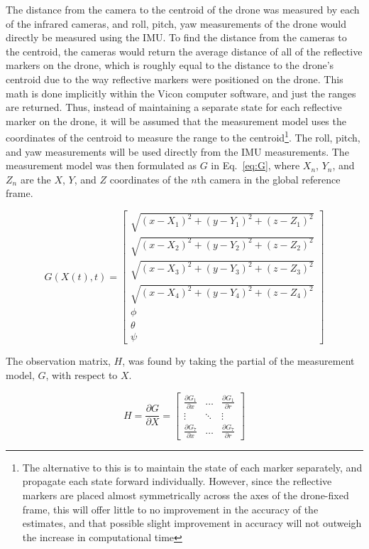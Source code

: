 \documentclass[letterpaper, paper,11pt]{AAS}	%
\begin{document}
The distance from the camera to the centroid of the drone was measured by each of the infrared cameras, and roll, pitch, yaw measurements of the drone would directly be measured using the IMU. To find the distance from the cameras to the centroid, the cameras would return the average distance of all of the reflective markers on the drone, which is roughly equal to the distance to the drone's centroid due to the way reflective markers were positioned on the drone. This math is done implicitly within the Vicon computer software, and just the ranges are returned. Thus, instead of maintaining a separate state for each reflective marker on the drone, it will be assumed that the measurement model uses the coordinates of the centroid to measure the range to the centroid\footnote{The alternative to this is to maintain the state of each marker separately, and propagate each state forward individually. However, since the reflective markers are placed almost symmetrically across the axes of the drone-fixed frame, this will offer little to no improvement in the accuracy of the estimates, and that possible slight improvement in accuracy will not outweigh the increase in computational time}. The roll, pitch, and yaw measurements will be used directly from the IMU measurements. The measurement model was then formulated as $G$ in Eq.~\ref{eq:G}, where $X_n$, $Y_n$, and $Z_n$ are the $X$, $Y$, and $Z$ coordinates of the $n$th camera in the global reference frame.

\begin{equation}
\label{eq:G}
G(X(t), t) = 
\begin{bmatrix}
	\sqrt{(x-X_1)^2 + (y-Y_1)^2 + (z-Z_1)^2} \\
	\sqrt{(x-X_2)^2 + (y-Y_2)^2 + (z-Z_2)^2} \\
	\sqrt{(x-X_3)^2 + (y-Y_3)^2 + (z-Z_3)^2} \\
	\sqrt{(x-X_4)^2 + (y-Y_4)^2 + (z-Z_4)^2} \\
	\phi \\
	\theta \\
	\psi
\end{bmatrix}
\end{equation}


The observation matrix, $H$, was found by taking the partial of the measurement model, $G$, with respect to $X$.

\begin{equation}
\label{eq:H}
H = \frac{\partial G}{\partial X} =
\begin{bmatrix} 
    \frac{\partial G_1}{\partial x} & \dots  & \frac{\partial G_1}{\partial r}\\
    \vdots & \ddots & \vdots\\
    \frac{\partial G_{7}}{\partial x} & \dots  & \frac{\partial G_{7}}{\partial r}
\end{bmatrix} 
\end{equation}
\end{document}

